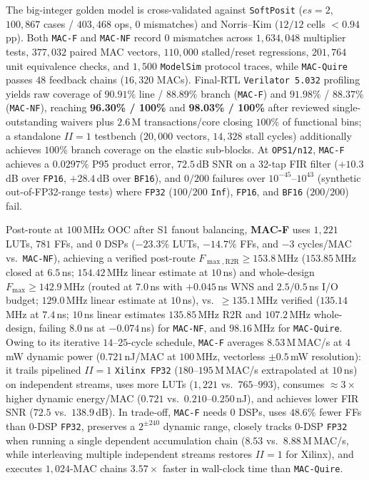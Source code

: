 The big-integer golden model is cross-validated against \texttt{SoftPosit} ($es=2$,
$100{,}867$ cases / $403{,}468$ ops, $0$ mismatches) and Norris--Kim ($12/12$ cells
$<0.94$\,pp). Both \texttt{MAC-F} and \texttt{MAC-NF} record $0$ mismatches across
$1{,}634{,}048$ multiplier tests, $377{,}032$ paired MAC vectors, $110{,}000$ stalled/reset
regressions, $201{,}764$ unit equivalence checks, and $1{,}500$ \texttt{ModelSim}
protocol traces, while \texttt{MAC-Quire} passes $48$ feedback chains ($16{,}320$ MACs).
Final-RTL \texttt{Verilator 5.032} profiling yields raw coverage of $90.91\%$
line / $88.89\%$ branch (\texttt{MAC-F}) and $91.98\%$ / $88.37\%$ (\texttt{MAC-NF}),
reaching \textbf{96.30\% / 100\%} and \textbf{98.03\% / 100\%} after reviewed
single-outstanding waivers plus $2.6$\,M transactions/core closing $100\%$ of
functional bins; a standalone $II=1$ testbench ($20{,}000$ vectors, $14{,}328$ stall
cycles) additionally achieves $100\%$ branch coverage on the elastic sub-blocks.
At \texttt{OPS1/n12}, \texttt{MAC-F} achieves a $0.0297\%$ P95 product error,
$72.5$\,dB SNR on a 32-tap FIR filter ($+10.3$\,dB over \texttt{FP16}, $+28.4$\,dB
over \texttt{BF16}), and $0/200$ failures over $10^{-45}\text{--}10^{43}$
(synthetic out-of-FP32-range tests) where
\texttt{FP32} ($100/200$ \texttt{Inf}), \texttt{FP16}, and \texttt{BF16} ($200/200$) fail.

Post-route at $100$\,MHz OOC after S1 fanout balancing, \textbf{MAC-F} uses
$1{,}221$ LUTs, $781$ FFs, and $0$ DSPs ($-23.3\%$ LUTs, $-14.7\%$ FFs, and $-3$
cycles/MAC vs.\ \texttt{MAC-NF}), achieving a verified post-route
$F_{\max,\mathrm{R2R}} \ge 153.8$\,MHz ($153.85$\,MHz closed at $6.5$\,ns;
$154.42$\,MHz linear estimate at $10$\,ns) and whole-design
$F_{\max} \ge 142.9$\,MHz (routed at $7.0$\,ns with $+0.045$\,ns WNS and $2.5/0.5$\,ns
I/O budget; $129.0$\,MHz linear estimate at $10$\,ns), vs.\ $\ge 135.1$\,MHz verified
($135.14$\,MHz at $7.4$\,ns; $10$\,ns linear estimates $135.85$\,MHz R2R and $107.2$\,MHz
whole-design, failing $8.0$\,ns at $-0.074$\,ns) for \texttt{MAC-NF}, and
$98.16$\,MHz for \texttt{MAC-Quire}. Owing to its iterative $14\text{--}25$-cycle
schedule, \texttt{MAC-F} averages $8.53$\,M\,MAC/s at $4$\,mW dynamic power
($0.721$\,nJ/MAC at $100$\,MHz, vectorless $\pm 0.5$\,mW resolution): it trails
pipelined $II=1$ \texttt{Xilinx FP32} ($180\text{--}195$\,M\,MAC/s extrapolated at $10$\,ns)
on independent streams, uses more LUTs ($1{,}221$ vs.\ $765\text{--}993$), consumes
$\approx 3\times$ higher dynamic energy/MAC ($0.721$ vs.\ $0.210\text{--}0.250$\,nJ),
and achieves lower FIR SNR ($72.5$ vs.\ $138.9$\,dB). In trade-off, \texttt{MAC-F}
needs $0$ DSPs, uses $48.6\%$ fewer FFs than $0$-DSP \texttt{FP32}, preserves a
$2^{\pm 240}$ dynamic range, closely tracks $0$-DSP \texttt{FP32} when running a
single dependent accumulation chain ($8.53$ vs.\ $8.88$\,M\,MAC/s, while interleaving
multiple independent streams restores $II=1$ for Xilinx), and executes $1{,}024$-MAC
chains $3.57\times$ faster in wall-clock time than \texttt{MAC-Quire}.
\reportcontents
\reportlists
